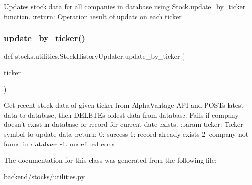 \begin{DoxyVerb}Updates stock data for all companies in database using
Stock.update_by_ticker function.
:return: Operation result of update on each ticker
\end{DoxyVerb}
 \mbox{\label{classstocks_1_1utilities_1_1_stock_history_updater_aa943ba0956fc5af74f69a32416d4246f}} 
\subsubsection{\texorpdfstring{update\+\_\+by\+\_\+ticker()}{update\_by\_ticker()}}
{\footnotesize\ttfamily def stocks.\+utilities.\+Stock\+History\+Updater.\+update\+\_\+by\+\_\+ticker (\begin{DoxyParamCaption}\item[{}]{ticker }\end{DoxyParamCaption})\hspace{0.3cm}{\ttfamily [static]}}

\begin{DoxyVerb}Get recent stock data of given ticker from AlphaVantage API and POSTs
latest data to database, then DELETEs oldest data from database.
Fails if company doesn't exist in database or record for current
date exists.
:param ticker: Ticker symbol to update data
:return: 0: success
 1: record already exists
 2: company not found in database
 -1: undefined error
\end{DoxyVerb}
 

The documentation for this class was generated from the following file\+:\begin{DoxyCompactItemize}
\item 
backend/stocks/utilities.\+py\end{DoxyCompactItemize}
